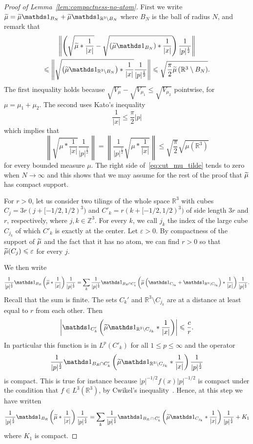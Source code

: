 \documentclass[AHL,Unicode,published]{cedram}
\newcommand{\R}{\mathbb{R}}
\newcommand{\Z}{\mathbb{Z}}
\newcommand\1{{\ensuremath {\mathds 1} }}
\newcommand{\ii}{\infty}
\newcommand{\norm}[1]{ \left\| #1 \right\|}
\renewcommand{\leq}{\leqslant}
\renewcommand{\tilde}{\widetilde}
\newcommand{\eps}{\varepsilon}
\let\oldtilde\tilde
\renewcommand*{\tilde}[1]{\mathchoice{\widetilde{#1}}{\widetilde{#1}}{\oldtilde{#1}}{\oldtilde{#1}}}
\begin{document}
\begin{proof}[Proof of Lemma~\ref{lem:compactness-no-atom}]
First we write $\tilde\mu=\tilde\mu \1_{B_N}+\tilde\mu \1_{\R^3\setminus B_N}$ where $B_N$ is the ball of radius $N$, and remark that
\begin{multline}\label{eq:cut_mu_tilde}
\norm{\left(\sqrt{\tilde\mu\ast\frac1{|x|}}-\sqrt{\left(\tilde\mu\1_{B_N}\right) \ast\frac1{|x|}}\right)\frac{1}{|p|^{\frac12}}}\\
\leq \norm{\sqrt{\left(\tilde\mu\1_{\R^3\setminus B_N}\right)\ast\frac1{|x|}}\frac{1}{|p|^{\frac12}}}\leq \sqrt{\frac\pi2 \tilde\mu\left(\R^3\setminus B_N\right)}.
\end{multline}
The first inequality holds because $\sqrt{V_{\mu}}-\sqrt{V_{\mu_1}}\leq \sqrt{V_{\mu_2}}$ pointwise, for $\mu=\mu_1+\mu_2$. The second uses Kato's inequality
\begin{equation}\label{eq:Kato}
\frac{1}{|x|}\leq\frac\pi2 |p|
\end{equation}
which implies that
\[
\norm{\sqrt{\mu\ast\frac1{|x|}}\frac1{|p|^{\frac12}}}=\norm{\frac1{|p|^{\frac12}}\sqrt{\mu\ast\frac1{|x|}}}\leq \sqrt{\frac\pi2}\sqrt{\mu\left(\R^3\right)}
\]
for every bounded measure $\mu$. The right side of~\eqref{eq:cut_mu_tilde} tends to zero when $N\to\ii$ and this shows that we may assume for the rest of the proof that $\tilde\mu$ has compact support.

For $r>0$, let us consider two tilings of the whole space $\R^3$ with cubes $C_j=3r(j+[-1/2,1/2)^3)$ and $C'_k=r(k+[-1/2,1/2)^3)$ of side length $3r$ and $r$, respectively, where $j,k\in\Z^3$. For every $k$, we call $j_k$ the index of the large cube $C_{j_k}$ of which $C'_k$ is exactly at the center. Let $\eps>0$. By compactness of the support of $\tilde\mu$ and the fact that it has no atom, we can find $r>0$ so that $\tilde\mu(C_j)\leq\eps$ for every $j$.

We then write
\[
\frac1{|p|^{\frac12}}\1_{B_R}\left(\tilde\mu\ast\frac1{|x|}\right)\frac1{|p|^{\frac12}}=\sum_{k}\frac1{|p|^{\frac12}}\1_{B_R\cap C'_k}\left(\tilde\mu\left(\1_{C_{j_k}}+\1_{\R^3\setminus C_{j_k}}\right)\ast\frac1{|x|}\right)\frac1{|p|^{\frac12}}.
\]
Recall that the sum is finite. The sets $C_k'$ and $\R^3\setminus C_{j_k}$ are at a distance at least equal to $r$ from each other. Then
\[
\left|\1_{C'_k}\left(\tilde\mu\1_{\R^3\setminus C_{j_k}}\ast\frac1{|x|}\right)\right|\leq\frac{c}{r}.
\]
In particular this function is in $L^p(C'_k)$ for all $1\leq p\leq\ii$ and the operator
\[
\frac1{|p|^{\frac12}}\1_{B_R\cap C'_k}\left(\tilde\mu\1_{\R^3\setminus C_{j_k}}\ast\frac1{|x|}\right)\frac1{|p|^{\frac12}}
\]
is compact. This is true for instance because $|p|^{-1/2}f(x)|p|^{-1/2}$ is compact under the condition that $f\in L^3(\R^3)$, by Cwikel's inequality~\cite{Simon-79}. Hence, at this step we have written
\[
\frac1{|p|^{\frac12}}\1_{B_R}\left(\tilde\mu\ast\frac1{|x|}\right)\frac1{|p|^{\frac12}}=\sum_{k}\frac1{|p|^{\frac12}}\1_{B_R\,\cap\,C'_{k}}\left(\tilde\mu\1_{C_{j_k}}\ast\frac1{|x|}\right)\frac1{|p|^{\frac12}}+K_1
\]
where $K_1$ is compact.


\end{proof}
\end{document}

